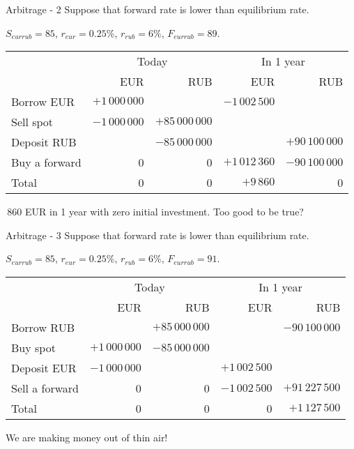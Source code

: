 \documentclass{beamer}
\begin{document}
\begin{frame}{Arbitrage - 2}
\justify
Suppose that forward rate is lower than equilibrium rate.

$S_{eurrub}=85$, $r_{eur}=0.25\%$, $r_{rub}=6\%$, $F_{eurrub}=89$. 

\justify
\centering
\small{
\begin{tabular}{l|r|r|r|r}
& \multicolumn{2}{c|}{Today} & \multicolumn{2}{c}{In 1 year} \\ \cline{2-5}
& EUR & RUB & EUR & RUB \\ \hline
Borrow EUR     & $+1\,000\,000$ &                                   & $-1\,002\,500$ & \\
Sell spot            & $-1\,000\,000$ & $+85\,000\,000$ &                               & \\
Deposit RUB    &                                & $-85\,000\,000$  &                                & $+90\,100\,000$ \\
Buy a forward & 0                             & 0                               & $+1\,012\,360$ & $-90\,100\,000$ \\ \hline
Total & 0 & 0 & $+9\,860$ & 0
\end{tabular}
}

\,860 EUR in 1 year with zero initial investment. Too good to be true?
\end{frame}



\begin{frame}{Arbitrage -  3}
\justify
Suppose that forward rate is lower than equilibrium rate.

 $S_{eurrub}=85$, $r_{eur}=0.25\%$, $r_{rub}=6\%$, $F_{eurrub}=91$. 

\justify
\centering
\small{
\begin{tabular}{l|r|r|r|r}
& \multicolumn{2}{c|}{Today} & \multicolumn{2}{c}{In 1 year} \\ \cline{2-5}
& EUR & RUB & EUR & RUB \\ \hline
Borrow RUB     &                               & $+85\,000\,000$  &                            & $-90\,100\,000$  \\
Buy spot            & $+1\,000\,000$ & $-85\,000\,000$ &                               &   \\
Deposit EUR    &  $-1\,000\,000$  &                                 & $+1\,002\,500$ &  \\
Sell a forward & 0                             & 0                               & $-1\,002\,500$ & $+91\,227\,500$ \\ \hline
Total & 0 & 0 & 0 & $+1\,127\,500$
\end{tabular}
}

\justify
We are making money out of thin air!
\end{frame}
\end{document}
